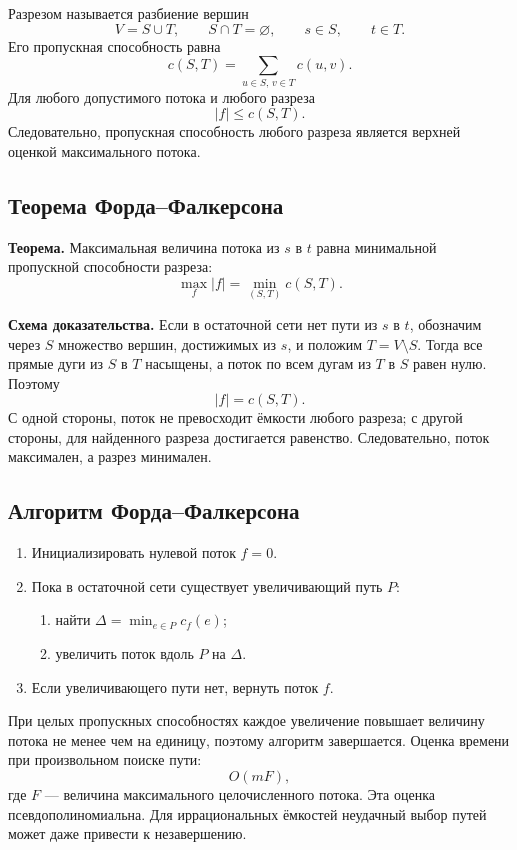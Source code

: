 Разрезом называется разбиение вершин
\[
    V=S\cup T,
    \qquad S\cap T=\varnothing,
    \qquad s\in S,
    \qquad t\in T.
\]
Его пропускная способность равна
\[
    c(S,T)=\sum_{u\in S,\,v\in T}c(u,v).
\]
Для любого допустимого потока и любого разреза
\[
    |f|\leq c(S,T).
\]
Следовательно, пропускная способность любого разреза является верхней оценкой
максимального потока.

\subsection{Теорема Форда--Фалкерсона}

\textbf{Теорема.}
Максимальная величина потока из $s$ в $t$ равна минимальной пропускной способности
разреза:
\[
    \max_f |f|=
    \min_{(S,T)}c(S,T).
\]

\textbf{Схема доказательства.}
Если в остаточной сети нет пути из $s$ в $t$, обозначим через $S$ множество
вершин, достижимых из $s$, и положим $T=V\setminus S$. Тогда все прямые дуги из
$S$ в $T$ насыщены, а поток по всем дугам из $T$ в $S$ равен нулю. Поэтому
\[
    |f|=c(S,T).
\]
С одной стороны, поток не превосходит ёмкости любого разреза; с другой стороны,
для найденного разреза достигается равенство. Следовательно, поток максимален,
а разрез минимален.

\subsection{Алгоритм Форда--Фалкерсона}

\begin{enumerate}
    \item Инициализировать нулевой поток $f=0$.
    \item Пока в остаточной сети существует увеличивающий путь $P$:
    \begin{enumerate}
        \item найти $\Delta=\min_{e\in P}c_f(e)$;
        \item увеличить поток вдоль $P$ на $\Delta$.
    \end{enumerate}
    \item Если увеличивающего пути нет, вернуть поток $f$.
\end{enumerate}

При целых пропускных способностях каждое увеличение повышает величину потока не
менее чем на единицу, поэтому алгоритм завершается. Оценка времени при произвольном
поиске пути:
\[
    O(mF),
\]
где $F$ --- величина максимального целочисленного потока. Эта оценка
псевдополиномиальна. Для иррациональных ёмкостей неудачный выбор путей может даже
привести к незавершению.

